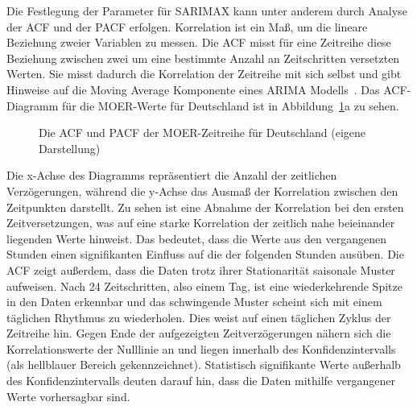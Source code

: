 Die Festlegung der Parameter für \ac{SARIMAX} kann unter anderem durch Analyse der \ac{ACF} und der \ac{PACF} erfolgen.
Korrelation ist ein Maß, um die lineare Beziehung zweier Variablen zu messen.
Die \ac{ACF} misst für eine Zeitreihe diese Beziehung zwischen zwei um eine bestimmte Anzahl an Zeitschritten versetzten Werten.
Sie misst dadurch die Korrelation der Zeitreihe mit sich selbst und gibt Hinweise auf die Moving Average Komponente eines \ac{ARIMA} Modells~\cite{Peixeiro.2022}.
Das \ac{ACF}-Diagramm für die \ac{MOER}-Werte für Deutschland ist in Abbildung~\ref{FIG:acf_pacf_moer_de}a zu sehen.
\begin{figure}
 \centering
 \qquad
 \caption[ACF und PACF der MOER Deutschlands]{Die ACF und PACF der MOER-Zeitreihe für Deutschland (eigene Darstellung)}%
 \label{FIG:acf_pacf_moer_de}%
\end{figure}
Die x-Achse des Diagramms repräsentiert die Anzahl der zeitlichen Verzögerungen, während die y-Achse das Ausmaß der Korrelation zwischen den Zeitpunkten darstellt.
Zu sehen ist eine Abnahme der Korrelation bei den ersten Zeitversetzungen, was auf eine starke Korrelation der zeitlich nahe beieinander liegenden Werte hinweist.
Das bedeutet, dass die Werte aus den vergangenen Stunden einen signifikanten Einfluss auf die der folgenden Stunden ausüben.
Die \ac{ACF} zeigt außerdem, dass die Daten trotz ihrer Stationarität saisonale Muster aufweisen.
Nach 24 Zeitschritten, also einem Tag, ist eine wiederkehrende Spitze in den Daten erkennbar und das schwingende Muster scheint sich mit einem täglichen Rhythmus zu wiederholen.
Dies weist auf einen täglichen Zyklus der Zeitreihe hin.
Gegen Ende der aufgezeigten Zeitverzögerungen nähern sich die Korrelationswerte der Nulllinie an und liegen innerhalb des Konfidenzintervalls (als hellblauer Bereich gekennzeichnet).
Statistisch signifikante Werte außerhalb des Konfidenzintervalls deuten darauf hin, dass die Daten mithilfe vergangener Werte vorhersagbar sind.

